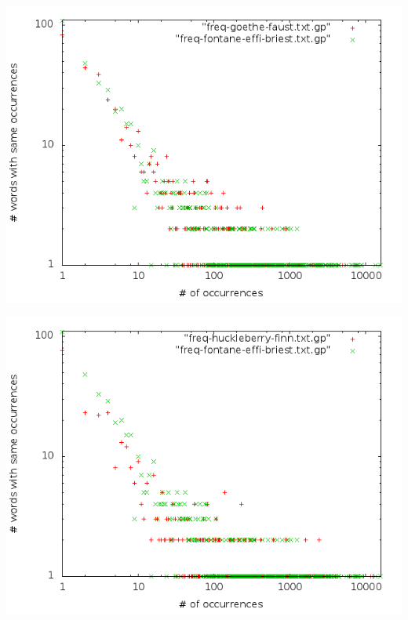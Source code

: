 \begin{frame}[c]
	\includegraphics[scale=0.4]{../task02-04/src/main/resources/results/task4/bigram/freq-de-de.png}
\end{frame}

\begin{frame}[c]
	\includegraphics[scale=0.4]{../task02-04/src/main/resources/results/task4/bigram/freq-de-en.png} 
\end{frame}